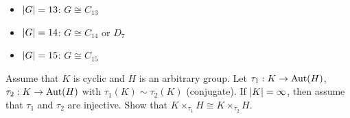 \begin{itemize}
\begin{proof}
\begin{itemize}
          And since $n_3 = 4$, there are $8$ elements of order $3$ which corresponds 
          to $8$ $3$-sycles in $A_4$, thus $\abs{\Image \phi \cap A_4} \ge 8$.
          But $\abs{\Image \phi \cap A_4} \Div \abs{A_4} = 12 \implies \Image \phi = A_4$
      \end{itemize}
    \end{proof}
    Now, for the case where $\exists H \in \Syl_3(G)$ and $H \lhd G$.
    Let $K \in \Syl_2(G)$, then $K \cap H = \{1\}$ and $KH = G \implies G \cong K \times_\tau H$
    for some $\tau: K \to \Aut(H) = \{\text{id}, \phi_2\}$
    \begin{itemize}
      \item $\tau$ is trivial: $\Zb_{12}$ or $\Zb_2 \times \Zb_6$.
      \item $\gen{b} = K \cong \Zb_4$: $\tau(b) = \phi_2 \implies G = \gen{a,b \mid a^3=1, b^4=1, bab^{-1} = a^{-1}} \not\cong D_6,A_4$
      \item $\gen{b} = K \cong \Zb_2 \times \Zb_2$: Let $K = \gen{b,c\mid b^2=1, c^2=1, bc=cb}$,
        then $\tau: b \mapsto \phi_2$ and $c \mapsto \text{id}$ (the other cases are equivalent to this one),
        $G = \gen{a,b,c \mid a^3 = 1, b^2 = 1, c^2 = 1, bc=cb,bab^{-1} = a^{-1}, cac^{-1} = a} \cong \gen{a,b\mid a^3=1,b^2=1, bab^{-1} = a^{-1}} \times \gen{c} \cong D_3 \times C_2 \cong D_6$
        \begin{fact}
          For odd $n$, $D_{2n} \cong D_n \times \quot{\Zb}{2\Zb}$.
          \begin{proof}
            \[D_{2n} = \gen{a,b\mid a^{2n}=1,b^2=1, bab^{-1} = a^{-1}}\]
            \[H = \gen{a^2,b\mid (a^2)^{n}=1,b^2=1, b(a^2)b^{-1} = a^{-2}} \cong D_n\]
            \[K = \gen{a^n} \cong C_2\]
            And $n$ is odd, so $H \cap K = \{1\}$ and $D_{2n} \cong D_n \times C_2$
          \end{proof}
        \end{fact}
    \end{itemize}
  \item $\lvert G\rvert = 13$: $G \cong C_{13}$
  \item $\lvert G\rvert = 14$: $G \cong C_{14} \text{~or~} D_7$
  \item $\lvert G\rvert = 15$: $G \cong C_{15}$
\end{itemize}

\begin{exercise} \mbox{}
  Assume that $K$ is cyclic and $H$ is an arbitrary group.
  Let $\tau_1: K \to \operatorname{Aut}(H)$, $\tau_2: K \to \operatorname{Aut}(H)$ with $\tau_1(K) \sim \tau_2(K)$ (conjugate).
  If $\lvert K\rvert = \infty$, then assume that $\tau_1$ and $\tau_2$ are injective. Show that $K \times_{\tau_1} H \cong K \times_{\tau_2} H$.
\end{exercise}

